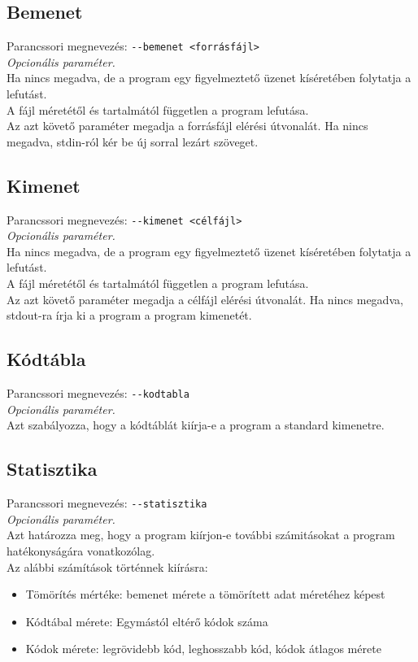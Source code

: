 \subsection{Bemenet}
\label{ssec:in}
Parancssori megnevezés: \texttt{-{}-bemenet <forrásfájl>} \\
{\it Opcionális paraméter.}\\
Ha nincs megadva, de a program egy figyelmeztető üzenet kíséretében folytatja a lefutást. \\
A fájl méretétől és tartalmától független a program lefutása. \\
Az azt követő paraméter megadja a forrásfájl elérési útvonalát. Ha nincs megadva, stdin-ról kér be új sorral lezárt szöveget.

\subsection{Kimenet}
\label{ssec:out}
Parancssori megnevezés: \texttt{-{}-kimenet <célfájl>} \\
{\it Opcionális paraméter.}\\
Ha nincs megadva, de a program egy figyelmeztető üzenet kíséretében folytatja a lefutást.\\
A fájl méretétől és tartalmától független a program lefutása. \\
Az azt követő paraméter megadja a célfájl elérési útvonalát. Ha nincs megadva, stdout-ra írja ki a program a program kimenetét.

\subsection{Kódtábla}
Parancssori megnevezés: \texttt{-{}-kodtabla} \\
{\it Opcionális paraméter.}\\
Azt szabályozza, hogy a kódtáblát kiírja-e a program a standard kimenetre.

\subsection{Statisztika}
Parancssori megnevezés: \texttt{-{}-statisztika} \\
{\it Opcionális paraméter.}\\
Azt határozza meg, hogy a program kiírjon-e további számitásokat a program hatékonyságára vonatkozólag.\\
Az alábbi számítások történnek kiírásra: \\
\begin{itemize}
    \item Tömörítés mértéke: bemenet mérete a tömörített adat méretéhez képest
    \item Kódtábal mérete: Egymástól eltérő kódok száma
    \item Kódok mérete: legrövidebb kód, leghosszabb kód, kódok átlagos mérete
\end{itemize}

